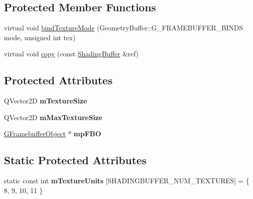 \subsection*{Protected Member Functions}
\begin{DoxyCompactItemize}
\item 
virtual void \mbox{\hyperlink{class_geometry_engine_1_1_geometry_buffer_1_1_shading_buffer_af589a4ab3f3c3cd92c373dc026e731ae}{bind\+Texture\+Mode}} (Geometry\+Buffer\+::\+G\+\_\+\+F\+R\+A\+M\+E\+B\+U\+F\+F\+E\+R\+\_\+\+B\+I\+N\+DS mode, unsigned int tex)
\item 
virtual void \mbox{\hyperlink{class_geometry_engine_1_1_geometry_buffer_1_1_shading_buffer_ac729c279a19db3d12a5be39aff5e2df1}{copy}} (const \mbox{\hyperlink{class_geometry_engine_1_1_geometry_buffer_1_1_shading_buffer}{Shading\+Buffer}} \&ref)
\end{DoxyCompactItemize}
\subsection*{Protected Attributes}
\begin{DoxyCompactItemize}
\item 
\mbox{\label{class_geometry_engine_1_1_geometry_buffer_1_1_shading_buffer_ab73b4933c8db2bd2c606a51bdfb93710}} 
Q\+Vector2D {\bfseries m\+Texture\+Size}
\item 
\mbox{\label{class_geometry_engine_1_1_geometry_buffer_1_1_shading_buffer_a5343eb21acd29398e8b343f0a9b5a6d8}} 
Q\+Vector2D {\bfseries m\+Max\+Texture\+Size}
\item 
\mbox{\label{class_geometry_engine_1_1_geometry_buffer_1_1_shading_buffer_ac96b8763e3eebd7564a9bc2607df6f89}} 
\mbox{\hyperlink{class_geometry_engine_1_1_geometry_buffer_1_1_g_framebuffer_object}{G\+Framebuffer\+Object}} $\ast$ {\bfseries mp\+F\+BO}
\end{DoxyCompactItemize}
\subsection*{Static Protected Attributes}
\begin{DoxyCompactItemize}
\item 
\mbox{\label{class_geometry_engine_1_1_geometry_buffer_1_1_shading_buffer_abf722158e9b91f9f787c220cc3a3e461}} 
static const int {\bfseries m\+Texture\+Units} \mbox{[}S\+H\+A\+D\+I\+N\+G\+B\+U\+F\+F\+E\+R\+\_\+\+N\+U\+M\+\_\+\+T\+E\+X\+T\+U\+R\+ES\mbox{]} = \{ 8, 9, 10, 11 \}
\end{DoxyCompactItemize}


